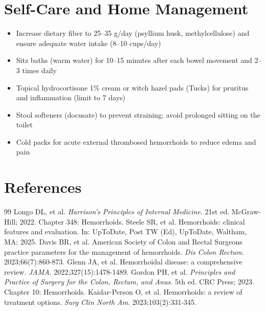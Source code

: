 \section*{Self-Care and Home Management}
\begin{itemize}
  \item Increase dietary fiber to 25--35 g/day (psyllium husk, methylcellulose) and ensure adequate water intake (8--10 cups/day)
  \item Sitz baths (warm water) for 10--15 minutes after each bowel movement and 2--3 times daily
  \item Topical hydrocortisone 1\% cream or witch hazel pads (Tucks) for pruritus and inflammation (limit to 7 days)
  \item Stool softeners (docusate) to prevent straining; avoid prolonged sitting on the toilet
  \item Cold packs for acute external thrombosed hemorrhoids to reduce edema and pain
\end{itemize}

\section*{References}

\begin{thebibliography}{99}
 Longo DL, et al. \emph{Harrison's Principles of Internal Medicine}. 21st ed. McGraw-Hill; 2022. Chapter 348: Hemorrhoids.
 Steele SR, et al. Hemorrhoids: clinical features and evaluation. In: UpToDate, Post TW (Ed), UpToDate, Waltham, MA; 2025.
 Davis BR, et al. American Society of Colon and Rectal Surgeons practice parameters for the management of hemorrhoids. \emph{Dis Colon Rectum}. 2023;66(7):860-873.
 Glenn JA, et al. Hemorrhoidal disease: a comprehensive review. \emph{JAMA}. 2022;327(15):1478-1489.
 Gordon PH, et al. \emph{Principles and Practice of Surgery for the Colon, Rectum, and Anus}. 5th ed. CRC Press; 2023. Chapter 10: Hemorrhoids.
 Kaidar-Person O, et al. Hemorrhoids: a review of treatment options. \emph{Surg Clin North Am}. 2023;103(2):331-345.
\end{thebibliography}
